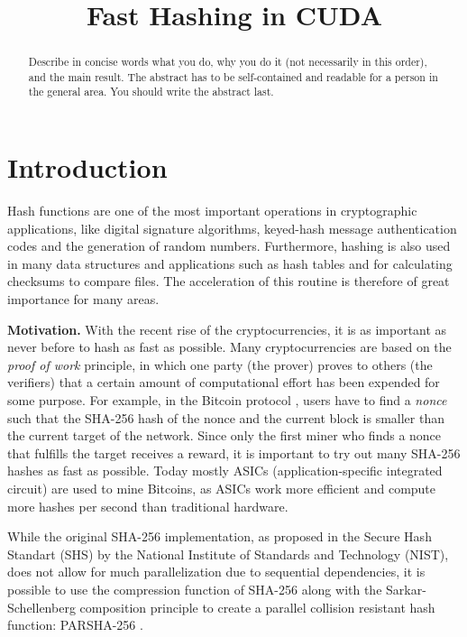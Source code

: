 \documentclass[letterpaper]{article}
\title{Fast Hashing in CUDA}
\newcommand{\mypar}[1]{{\bf #1.}}
\begin{document}
%
\maketitle
%


\begin{abstract}
Describe in concise words what you do, why you do it (not necessarily
in this order), and the main result.  The abstract has to be
self-contained and readable for a person in the general area. You
should write the abstract last.
\end{abstract}

\section{Introduction}\label{sec:intro}
Hash functions are one of the most important operations in cryptographic applications, like digital signature algorithms, keyed-hash message authentication codes and the generation of random numbers. Furthermore, hashing is also used in many data structures and applications such as hash tables and for calculating checksums to compare files.  The acceleration of this routine is therefore of great importance for many areas.

\mypar{Motivation} With the recent rise of the cryptocurrencies, it is as important as never before to hash as fast as possible. Many cryptocurrencies are based on the \emph{proof of work} \cite{pow} principle, in which one party (the prover) proves to others (the verifiers) that a certain amount of computational effort has been expended for some purpose. For example, in the Bitcoin protocol \cite{nakamoto2012bitcoin}, users have to find a \emph{nonce} such that the SHA-256 hash of the nonce and the current block is smaller than the current target of the network. Since only the first miner who finds a nonce that fulfills the target receives a reward, it is important to try out many SHA-256 hashes as fast as possible. Today mostly ASICs (application-specific integrated circuit) are used to mine Bitcoins, as ASICs work more efficient and compute more hashes per second than traditional hardware.

While the original SHA-256 implementation, as proposed in the Secure Hash Standart (SHS) \cite{sha} by the National Institute of Standards and Technology (NIST), does not allow for much parallelization due to sequential dependencies, it is possible to use the compression function of SHA-256 along with the Sarkar-Schellenberg composition principle \cite{sarkar} to create a parallel collision resistant hash function: PARSHA-256 \cite{parsha256}. 
\end{document}
